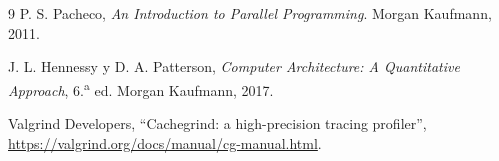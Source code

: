 \documentclass[11pt]{article}
\begin{document}
\begin{thebibliography}{9}
P. S. Pacheco, \emph{An Introduction to Parallel Programming}. Morgan Kaufmann, 2011.

J. L. Hennessy y D. A. Patterson, \emph{Computer Architecture: A Quantitative Approach}, 6.\textsuperscript{a} ed. Morgan Kaufmann, 2017.

Valgrind Developers, ``Cachegrind: a high-precision tracing profiler'',
\url{https://valgrind.org/docs/manual/cg-manual.html}.
\end{thebibliography}
\end{document}

